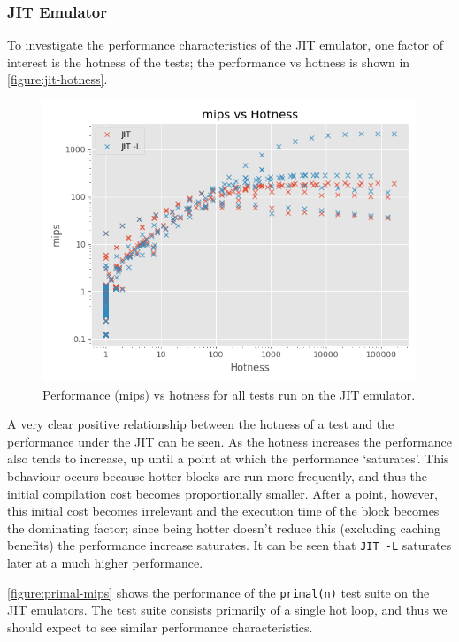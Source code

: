 \subsubsection{JIT Emulator}


To investigate the performance characteristics of the JIT emulator, one factor of interest is the hotness of the tests; the performance vs hotness is shown in \autoref{figure:jit-hotness}.

\begin{figure}[H]
    \centering
    \includegraphics[scale=0.75]{output/graphs/scatter/jit/hotness.png}
    \caption{Performance (mips) vs hotness for all tests run on the JIT emulator.}
    \label{figure:jit-hotness}
\end{figure}

A very clear positive relationship between the hotness of a test and the performance under the JIT can be seen. As the hotness increases the performance also tends to increase, up until a point at which the performance `saturates'. This behaviour occurs because hotter blocks are run more frequently, and thus the initial compilation cost becomes proportionally smaller. After a point, however, this initial cost becomes irrelevant and the execution time of the block becomes the dominating factor; since being hotter doesn't reduce this (excluding caching benefits) the performance increase saturates. It can be seen that \texttt{JIT -L} saturates later at a much higher performance.

\autoref{figure:primal-mips} shows the performance of the \texttt{primal(n)} test suite on the JIT emulators. The test suite consists primarily of a single hot loop, and thus we should expect to see similar performance characteristics.

